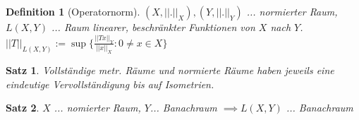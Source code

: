 \documentclass[]{article}
\newtheorem*{theorem}{Satz}
\newtheorem*{definition}{Definition}
\begin{document}
\begin{definition}[Operatornorm]
	$(X, ||.||_X), (Y, ||.||_Y)$ ... normierter Raum, $L(X,Y)$ ... Raum linearer, beschränkter Funktionen von $X$ nach $Y$. $||T||_{L(X,Y)}:= \sup\{\frac{||Tx||_Y}{||x||_X}: 0\neq x \in X\}$
\end{definition}

\begin{theorem}
	Vollständige metr. Räume und normierte Räume haben jeweils eine eindeutige Vervollständigung bis auf Isometrien.
\end{theorem}

\begin{theorem}
	$X$ ... nomierter Raum, $Y$... Banachraum $\implies L(X,Y)$ ... Banachraum
\end{theorem}
\end{document}
